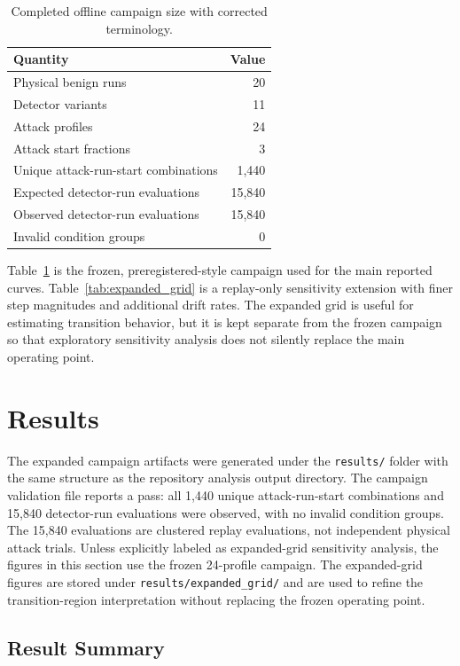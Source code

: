\documentclass[conference]{IEEEtran}
\begin{document}
\begin{table}[t]
\centering
\caption{Completed offline campaign size with corrected terminology.}
\label{tab:campaign_size}
\scriptsize
\begin{tabular}{lr}
\toprule
\textbf{Quantity} & \textbf{Value} \\
\midrule
Physical benign runs & 20 \\
Detector variants & 11 \\
Attack profiles & 24 \\
Attack start fractions & 3 \\
Unique attack-run-start combinations & 1,440 \\
Expected detector-run evaluations & 15,840 \\
Observed detector-run evaluations & 15,840 \\
Invalid condition groups & 0 \\
\bottomrule
\end{tabular}
\end{table}

Table~\ref{tab:campaign_size} is the frozen, preregistered-style campaign used
for the main reported curves. Table~\ref{tab:expanded_grid} is a replay-only
sensitivity extension with finer step magnitudes and additional drift rates.
The expanded grid is useful for estimating transition behavior, but it is kept
separate from the frozen campaign so that exploratory sensitivity analysis does
not silently replace the main operating point.

\section{Results}
\label{sec:results}

The expanded campaign artifacts were generated under the
\texttt{results/} folder with the same structure as the repository analysis
output directory. The campaign validation file reports a pass: all 1,440
unique attack-run-start combinations and 15,840 detector-run evaluations were
observed, with no invalid condition groups. The 15,840 evaluations are
clustered replay evaluations, not independent physical attack trials.
Unless explicitly labeled as expanded-grid sensitivity analysis, the figures
in this section use the frozen 24-profile campaign. The expanded-grid figures
are stored under \texttt{results/expanded\_grid/} and are used to refine the
transition-region interpretation without replacing the frozen operating point.

\subsection{Result Summary}
\end{document}
